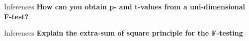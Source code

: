 \documentclass{beamer}
\begin{document}
\begin{frame}{Inferences}
  \textbf{How can you obtain p- and t-values from a uni-dimensional F-test?}

% 
% 
\end{frame}

\begin{frame}{Inferences}
  \textbf{Explain the extra-sum of square principle for the F-testing}

\end{frame}


% 
\end{document}
